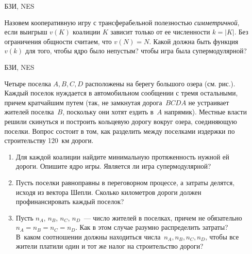 \begin{problem}  
\begin{source}
БЗИ, NES
\end{source}
Назовем кооперативную игру с
трансферабельной полезностью {\it симметричной}, если
выигрыш $v(K)$ коалиции $K$ зависит только от ее
численности $k=|K|$. Без ограничения общности считаем, что
$v(N)=N$. Какой должна быть функция $v(k)$ для того, чтобы
ядро было непустым? чтобы игра была супермодулярной?

\begin{sol}

\end{sol}
\end{problem}




\begin{problem}  
\begin{source}
БЗИ, NES
\end{source} Четыре поселка $A,B,C,D$
расположены на берегу большого озера (см. рис.). Каждый
поселок нуждается в автомобильном сообщении с тремя
остальными, причем кратчайшим путем (так, не замкнутая
дорога~$B C D A$ не устраивает жителей поселка~$B$,
поскольку они хотят ездить в~$A$ напрямик). Местные власти
решили скинуться и построить кольцевую дорогу вокруг озера,
соединяющую поселки. Вопрос состоит в том, как разделить
между поселками издержки по строительству 120~км дороги.

\begin{enumerate}

\item Для каждой коалиции найдите минимальную протяженность
нужной ей дороги. Опишите ядро игры. Является ли игра
супермодулярной?

\item Пусть поселки равноправны в переговорном процессе, а
затраты делятся, исходя из вектора Шепли. Сколько
километров дороги должен профинансировать каждый поселок?

\item Пусть $n_A$, $n_B$, $n_C$, $n_D$~--- число жителей в
поселках, причем не обязательно $n_A=n_B=n_C=n_D$. Как в
этом случае разумно распределить затраты? В~каком
соотношении должны находиться числа~$n_A,n_B,n_C,n_D$,
чтобы все жители платили один и тот же налог на
строительство дороги?

\end{enumerate}


\end{problem}
